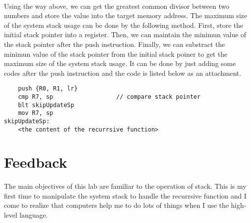 \paragraph{}
Using the way above, we can get the greatest common divisor between two numbers and store the value into the target memory address. The maximum size of the system stack usage can be done by the following method. First, store the initial stack pointer into a register. Then, we can maintain the minimun value of the stack pointer after the push instruction. Finally, we can substract the minimun value of the stack pointer from the initial stack poiner to get the maximum size of the system stack usage. It can be done by just adding some codes after the push instruction and the code is listed below as an attachment.
\begin{lstlisting}
    push {R0, R1, lr}
    cmp R7, sp                  // compare stack pointer
    blt skipUpdateSp
    mov R7, sp
skipUpdateSp:
    <the content of the recurrsive function>
\end{lstlisting}
\section{Feedback}
\paragraph{}
The main objectives of this lab are familiar to the operation of stack. This is my first time to manipulate the system stack to handle the recurrsive function and I come to realize that computers help me to do lots of things when I use the high-level language.
